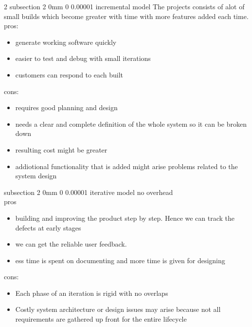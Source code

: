 \documentclass[a4paper,11pt]{article}
\makeatletter
\renewcommand{\subsection}{\@startsection
   {subsection}%
   {2}%
   {0mm}%
   {0\baselineskip}%
   {0.00001\baselineskip}%
   {\rmfamily\normalfont\slshape\normalsize}}%
\makeatother
\begin{document}
\begin{multicols}{2}
\subsection{incremental model}
The projects consists of alot of small builds which become greater with time with more features added each time. 
\\pros:
\vspace{0 mm}
\begin{itemize}
 \setlength\itemsep{0em}
\item generate working software quickly
\item easier to test and debug with small iterations
\item customers can respond to each built
\end{itemize}
cons:
\vspace{0 mm}
\begin{itemize}
 \setlength\itemsep{0em}
\item requires good planning and design
\item needs a clear and complete definition of the whole system so it can be broken down
\item resulting cost might be greater
\item addiotional functionality that is added might arise problems related to the system design
\end{itemize} 

\subsection{iterative model}
no overhead
\\pros
\vspace{0 mm}
\begin{itemize}
 \setlength\itemsep{0em}
\item building and improving the product step by step. Hence we can track the defects at early stages
\item we can get the reliable user feedback.
\item ess time is spent on documenting and more time is given for designing
\end{itemize}
cons:
\vspace{0 mm}
\begin{itemize}
 \setlength\itemsep{0em}
\item Each phase of an iteration is rigid with no overlaps
\item Costly system architecture or design issues may arise because not all requirements are gathered up front for the entire lifecycle
\end{itemize}


\end{multicols}
\end{document}
